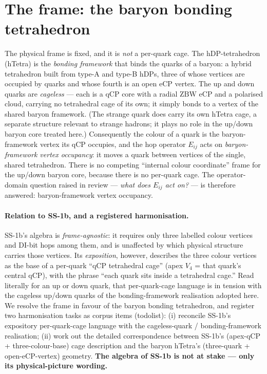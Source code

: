 \documentclass[11pt,a4paper]{article}
\newcommand{\hDP}{\mathrm{hDP}}
\newcommand{\qCP}{\mathrm{qCP}}
\newcommand{\eCP}{\mathrm{eCP}}
\newcommand{\ZBW}{\mathrm{ZBW}}
\begin{document}
\section{The frame: the baryon bonding tetrahedron}
\label{sec:seam}

The physical frame is fixed, and it is \emph{not} a per-quark cage. The
$\hDP$-tetrahedron (hTetra) is the \emph{bonding framework} that binds the quarks
of a baryon: a hybrid tetrahedron built from type-A and type-B $\hDP$s, three of
whose vertices are occupied by quarks and whose fourth is an open $\eCP$ vertex.
The up and down quarks are \emph{cageless} --- each is a $\qCP$ core with a
radial $\ZBW$ $\eCP$ and a polarised cloud, carrying no tetrahedral cage of its
own; it simply bonds to a vertex of the shared baryon framework. (The strange
quark does carry its own hTetra cage, a separate structure relevant to strange
hadrons; it plays no role in the up/down baryon core treated here.) Consequently
the colour of a quark is the baryon-framework vertex its $\qCP$ occupies, and the
hop operator $E_{ij}$ acts on \emph{baryon-framework vertex occupancy}: it moves
a quark between vertices of the single, shared tetrahedron. There is no competing
``internal colour coordinate'' frame for the up/down baryon core, because there
is no per-quark cage. The operator-domain question raised in review --- \emph{what
does $E_{ij}$ act on?} --- is therefore answered: baryon-framework vertex
occupancy.

\paragraph{Relation to SS-1b, and a registered harmonisation.} SS-1b's algebra
is \emph{frame-agnostic}: it requires only three labelled colour vertices and
DI-bit hops among them, and is unaffected by which physical structure carries
those vertices. Its \emph{exposition}, however, describes the three colour
vertices as the base of a per-quark ``$\qCP$ tetrahedral cage'' (apex $V_4$ = that
quark's central $\qCP$), with the phrase ``each quark sits inside a tetrahedral
cage.'' Read literally for an up or down quark, that per-quark-cage language is
in tension with the cageless up/down quarks of the bonding-framework realisation
adopted here. We resolve the frame in favour of the baryon bonding tetrahedron,
and register two harmonisation tasks as corpus items (todolist): (i) reconcile
SS-1b's expository per-quark-cage language with the cageless-quark /
bonding-framework realisation; (ii) work out the detailed correspondence between
SS-1b's (apex-$\qCP$ + three-colour-base) cage description and the baryon hTetra's
(three-quark + open-$\eCP$-vertex) geometry. \textbf{The algebra of SS-1b is not at
stake --- only its physical-picture wording.}
\end{document}
